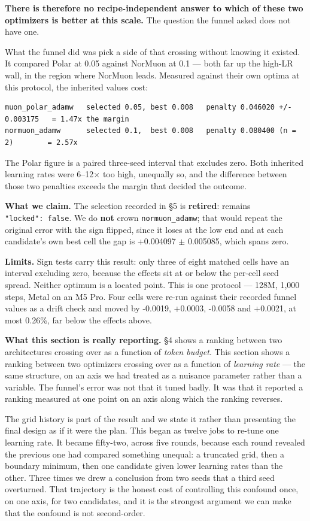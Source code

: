 \textbf{There is therefore no recipe-independent answer to which of these two optimizers is better at
this scale.} The question the funnel asked does not have one.

What the funnel did was pick a side of that crossing without knowing it existed. It compared Polar
at 0.05 against NorMuon at 0.1 --- both far up the high-LR wall, in the region where NorMuon leads.
Measured against their own optima at this protocol, the inherited values cost:

\begin{verbatim}
muon_polar_adamw   selected 0.05, best 0.008   penalty 0.046020 +/- 0.003175   = 1.47x the margin
normuon_adamw      selected 0.1,  best 0.008   penalty 0.080400 (n = 2)        = 2.57x
\end{verbatim}

The Polar figure is a paired three-seed interval that excludes zero. Both inherited learning rates
were 6--12$\times$ too high, unequally so, and the difference between those two penalties exceeds the
margin that decided the outcome.

\textbf{What we claim.} The selection recorded in \S5 is \textbf{retired}: 
remains \texttt{"locked":\ false}. We do \textbf{not} crown \texttt{normuon\_adamw}; that would repeat the original
error with the sign flipped, since it loses at the low end and at each candidate's own best cell
the gap is +0.004097 $\pm$ 0.005085, which spans zero.

\textbf{Limits.} Sign tests carry this result: only three of eight matched cells have an interval
excluding zero, because the effects sit at or below the per-cell seed spread. Neither optimum is a
located point. This is one protocol --- 128M, 1,000 steps, Metal on an M5 Pro. Four cells were
re-run against their recorded funnel values as a drift check and moved by -0.0019, +0.0003,
-0.0058 and +0.0021, at most 0.26\%, far below the effects above.

\textbf{What this section is really reporting.} \S4 shows a ranking between two architectures crossing
over as a function of \emph{token budget}. This section shows a ranking between two optimizers crossing
over as a function of \emph{learning rate} --- the same structure, on an axis we had treated as a nuisance
parameter rather than a variable. The funnel's error was not that it tuned badly. It was that it
reported a ranking measured at one point on an axis along which the ranking reverses.

The grid history is part of the result and we state it rather than presenting the final design as
if it were the plan. This began as twelve jobs to re-tune one learning rate. It became fifty-two,
across five rounds, because each round revealed the previous one had compared something unequal: a
truncated grid, then a boundary minimum, then one candidate given lower learning rates than the
other. Three times we drew a conclusion from two seeds that a third seed overturned. That
trajectory is the honest cost of controlling this confound once, on one axis, for two candidates,
and it is the strongest argument we can make that the confound is not second-order.

